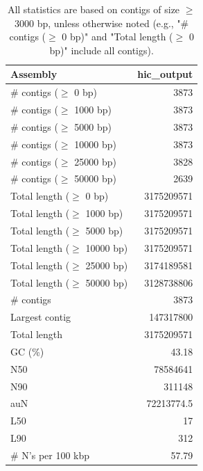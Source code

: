 \documentclass[12pt,a4paper]{article}
\begin{document}
\begin{table}[ht]
\begin{center}
\caption{All statistics are based on contigs of size $\geq$ 3000 bp, unless otherwise noted (e.g., "\# contigs ($\geq$ 0 bp)" and "Total length ($\geq$ 0 bp)" include all contigs).}
\begin{tabular}{|l*{1}{|r}|}
\hline
Assembly & hic\_output \\ \hline
\# contigs ($\geq$ 0 bp) & 3873 \\ \hline
\# contigs ($\geq$ 1000 bp) & 3873 \\ \hline
\# contigs ($\geq$ 5000 bp) & 3873 \\ \hline
\# contigs ($\geq$ 10000 bp) & 3873 \\ \hline
\# contigs ($\geq$ 25000 bp) & 3828 \\ \hline
\# contigs ($\geq$ 50000 bp) & 2639 \\ \hline
Total length ($\geq$ 0 bp) & 3175209571 \\ \hline
Total length ($\geq$ 1000 bp) & 3175209571 \\ \hline
Total length ($\geq$ 5000 bp) & 3175209571 \\ \hline
Total length ($\geq$ 10000 bp) & 3175209571 \\ \hline
Total length ($\geq$ 25000 bp) & 3174189581 \\ \hline
Total length ($\geq$ 50000 bp) & 3128738806 \\ \hline
\# contigs & 3873 \\ \hline
Largest contig & 147317800 \\ \hline
Total length & 3175209571 \\ \hline
GC (\%) & 43.18 \\ \hline
N50 & 78584641 \\ \hline
N90 & 311148 \\ \hline
auN & 72213774.5 \\ \hline
L50 & 17 \\ \hline
L90 & 312 \\ \hline
\# N's per 100 kbp & 57.79 \\ \hline
\end{tabular}
\end{center}
\end{table}
\end{document}
